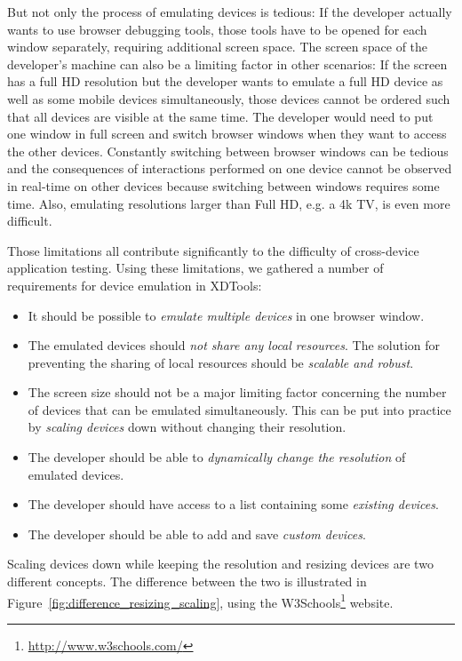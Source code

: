 But not only the process of emulating devices is tedious: If the developer actually wants to use browser debugging tools, those tools have to be opened for each window separately, requiring additional screen space. The screen space of the developer's machine can also be a limiting factor in other scenarios: If the screen has a full HD resolution but the developer wants to emulate a full HD device as well as some mobile devices simultaneously, those devices cannot be ordered such that all devices are visible at the same time. The developer would need to put one window in full screen and switch browser windows when they want to access the other devices. Constantly switching between browser windows can be tedious and the consequences of interactions performed on one device cannot be observed in real-time on other devices because switching between windows requires some time. Also, emulating resolutions larger than Full HD, e.g. a 4k TV, is even more difficult.

Those limitations all contribute significantly to the difficulty of cross-device application testing. Using these limitations, we gathered a number of requirements for device emulation in XDTools:
\begin{itemize}
	\item It should be possible to \emph{emulate multiple devices} in one browser window.
	\item The emulated devices should \emph{not share any local resources}. The solution for preventing the sharing of local resources should be \emph{scalable and robust}.
	\item The screen size should not be a major limiting factor concerning the number of devices that can be emulated simultaneously. This can be put into practice by \emph{scaling devices} down without changing their resolution.
	\item The developer should be able to \emph{dynamically change the resolution} of emulated devices.
	\item The developer should have access to a list containing some \emph{existing devices}.
	\item The developer should be able to add and save \emph{custom devices}.
\end{itemize}

Scaling devices down while keeping the resolution and resizing devices are two different concepts. The difference between the two is illustrated in Figure~\ref{fig:difference_resizing_scaling}, using the W3Schools\footnote{\url{http://www.w3schools.com/}} website.

